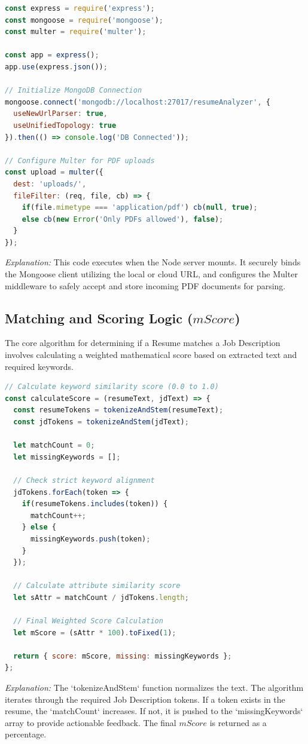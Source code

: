 \documentclass[12pt,a4paper]{report}
\begin{document}
\begin{lstlisting}[language=JavaScript]
const express = require('express');
const mongoose = require('mongoose');
const multer = require('multer');

const app = express();
app.use(express.json());

// Initialize MongoDB Connection
mongoose.connect('mongodb://localhost:27017/resumeAnalyzer', {
  useNewUrlParser: true,
  useUnifiedTopology: true
}).then(() => console.log('DB Connected'));

// Configure Multer for PDF uploads
const upload = multer({ 
  dest: 'uploads/',
  fileFilter: (req, file, cb) => {
    if(file.mimetype === 'application/pdf') cb(null, true);
    else cb(new Error('Only PDFs allowed'), false);
  }
});
\end{lstlisting}
\textit{Explanation:} This code executes when the Node server mounts. It securely binds the Mongoose client utilizing the local or cloud URL, and configures the Multer middleware to safely accept and store incoming PDF documents for parsing.

\subsection{Matching and Scoring Logic ($mScore$)}
The core algorithm for determining if a Resume matches a Job Description involves calculating a weighted mathematical score based on extracted text and required keywords.

\begin{lstlisting}[language=JavaScript]
// Calculate keyword similarity score (0.0 to 1.0)
const calculateScore = (resumeText, jdText) => {
  const resumeTokens = tokenizeAndStem(resumeText);
  const jdTokens = tokenizeAndStem(jdText);
  
  let matchCount = 0;
  let missingKeywords = [];

  // Check strict keyword alignment
  jdTokens.forEach(token => {
    if(resumeTokens.includes(token)) {
      matchCount++;
    } else {
      missingKeywords.push(token);
    }
  });

  // Calculate attribute similarity score
  let sAttr = matchCount / jdTokens.length;

  // Final Weighted Score Calculation
  let mScore = (sAttr * 100).toFixed(1);
  
  return { score: mScore, missing: missingKeywords };
};
\end{lstlisting}
\textit{Explanation:} The `tokenizeAndStem` function normalizes the text. The algorithm iterates through the required Job Description tokens. If a token exists in the resume, the `matchCount` increases. If not, it is pushed to the `missingKeywords` array to provide actionable feedback. The final $mScore$ is returned as a percentage.
\end{document}
